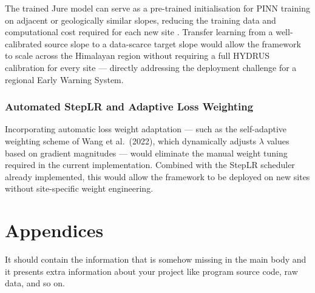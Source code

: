 \documentclass[12pt]{report}
\begin{document}
The trained Jure model can serve as a pre-trained initialisation
for PINN training on adjacent or geologically similar slopes,
reducing the training data and computational cost required for
each new site \cite{giri2019transfer}. Transfer learning from
a well-calibrated source slope to a data-scarce target slope
would allow the framework to scale across the Himalayan region
without requiring a full HYDRUS calibration for every site —
directly addressing the deployment challenge for a regional
Early Warning System.

\subsection{Automated StepLR and Adaptive Loss Weighting}

Incorporating automatic loss weight adaptation — such as the
self-adaptive weighting scheme of Wang et al.\ (2022), which
dynamically adjusts $\lambda$ values based on gradient magnitudes
— would eliminate the manual weight tuning required in the current
implementation. Combined with the StepLR scheduler already
implemented, this would allow the framework to be deployed on
new sites without site-specific weight engineering.
\renewcommand{\bibname}{References}


\chapter*{Appendices}
It should contain the information that is somehow missing in the main body and it presents extra information about your project like program source code, raw data, and so on.
\end{document}
